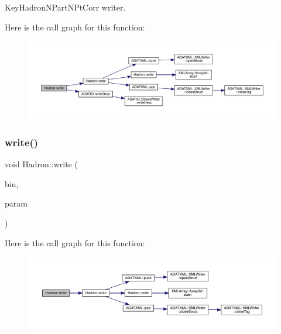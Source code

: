 Key\+Hadron\+N\+Part\+N\+Pt\+Corr writer. 

Here is the call graph for this function\+:
\nopagebreak
\begin{figure}[H]
\begin{center}
\leavevmode
\includegraphics[width=350pt]{d1/daf/namespaceHadron_adfbaeaa21e67fb5560f0cf7bddc6ce70_cgraph}
\end{center}
\end{figure}
\mbox{\label{namespaceHadron_a70fe8dc6184653dde216306a0f4681d9}} 
\subsubsection{\texorpdfstring{write()}{write()}\hspace{0.1cm}{\footnotesize\ttfamily [60/95]}}
{\footnotesize\ttfamily void Hadron\+::write (\begin{DoxyParamCaption}\item[{\mbox{\hyperlink{classADATIO_1_1BinaryWriter}{Binary\+Writer}} \&}]{bin,  }\item[{const \mbox{\hyperlink{structHadron_1_1HadronDiagramTimeSlices__t}{Hadron\+Diagram\+Time\+Slices\+\_\+t}} \&}]{param }\end{DoxyParamCaption})}

Here is the call graph for this function\+:
\nopagebreak
\begin{figure}[H]
\begin{center}
\leavevmode
\includegraphics[width=350pt]{d1/daf/namespaceHadron_a70fe8dc6184653dde216306a0f4681d9_cgraph}
\end{center}
\end{figure}
\mbox{\label{namespaceHadron_af1d6496318c689e52be27a9f842ccc2d}} 
